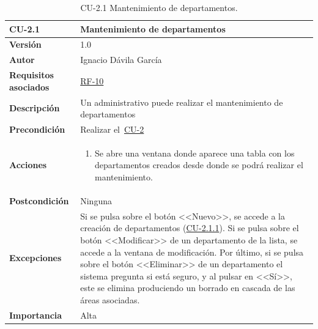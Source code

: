 \begin{table}[p]
\label{table:CU-2.1}
	\centering
	\begin{tabularx}{\linewidth}{ p{} p{} }
		\toprule
		\textbf{CU-2.1}    & \textbf{Mantenimiento de departamentos}\\
		\toprule
		\textbf{Versión}              & 1.0    \\
		\textbf{Autor}                & Ignacio Dávila García \\
		\textbf{Requisitos asociados} & \hyperref[itm:RF10]{RF-10} \\
		\textbf{Descripción}          & Un administrativo puede realizar el mantenimiento de departamentos \\
		\textbf{Precondición}         & Realizar el~\hyperref[table:CU-2]{CU-2} \\
		\textbf{Acciones}             &
		\begin{enumerate}
			\def\labelenumi{\arabic{enumi}.}
			\tightlist
			\item Se abre una ventana donde aparece una tabla con los departamentos creados desde donde se podrá realizar el mantenimiento.
		\end{enumerate}\\
		\textbf{Postcondición}        & Ninguna \\
		\textbf{Excepciones}          & Si se pulsa sobre el botón <<Nuevo>>, se accede a la creación de departamentos (\hyperref[table:CU-2.1.1]{CU-2.1.1}). Si se pulsa sobre el botón <<Modificar>> de un departamento de la lista, se accede a la ventana de modificación. Por último, si se pulsa sobre el botón <<Eliminar>> de un departamento el sistema pregunta si está seguro, y al pulsar en <<Sí>>, este se elimina produciendo un borrado en cascada de las áreas asociadas. \\
		\textbf{Importancia}          & Alta \\
		\bottomrule
	\end{tabularx}
	\caption{CU-2.1 Mantenimiento de departamentos.}
\end{table}
\FloatBarrier

